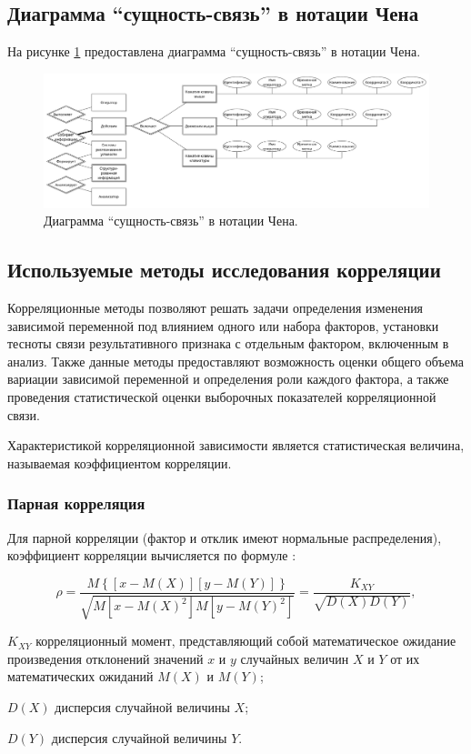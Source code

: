 \subsection{Диаграмма ``сущность-связь'' в нотации Чена}
На рисунке \ref{fig:erDiag} предоставлена диаграмма ``сущность-связь'' в нотации Чена.

\begin{figure}[H]
	\centering
	\includegraphics[scale=0.28]{img/chenERDiagram.pdf}
	\caption{Диаграмма ``сущность-связь'' в нотации Чена.}
	\label{fig:erDiag}
\end{figure}


\subsection{Используемые методы исследования корреляции}
Корреляционные методы позволяют решать задачи определения изменения зависимой переменной под влиянием одного или набора факторов, установки тесноты связи результативного признака с отдельным фактором, включенным в анализ. Также данные методы предоставляют возможность оценки общего объема вариации зависимой переменной и определения роли каждого фактора, а также проведения статистической оценки выборочных показателей корреляционной связи. \cite{correlInEco}

Характеристикой корреляционной зависимости является статистическая величина, называемая коэффициентом корреляции. \cite{corelMethod}

\subsubsection{Парная корреляция}

Для парной корреляции (фактор и отклик имеют нормальные распределения), коэффициент корреляции вычисляется по формуле \cite{corelMethod}:

\begin{equation}
\label{eq:corelPara}
\rho = \frac{M\left \{\left[x-M\left(X\right)\right]\left[y-M(Y)\right]\right \}}{\sqrt{M\left[x-M\left(X\right)^2\right]M\left[y-M\left(Y\right)^2\right]}} = \frac{K_{XY}}{\sqrt{D\left(X\right)D\left (Y\right)}},
\end{equation}
\begin{eqexpl}[15mm]
\item{$K_{XY}$} корреляционный момент, представляющий собой математическое ожидание произведения отклонений значений $x$ и $y$ случайных величин $X$ и $Y$ от их математических ожиданий $M(X)$ и $M(Y)$;
\item{$D(X)$} дисперсия случайной величины $X$;
\item{$D(Y)$} дисперсия случайной величины $Y$.
\end{eqexpl}

